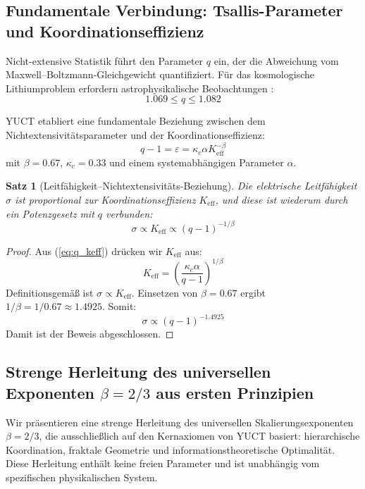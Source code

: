 \documentclass[12pt,a4paper]{article}
\newtheorem{theorem}{Satz}[section]
\theoremstyle{remark}
\newcommand{\Ke}{K_{\mathrm{eff}}}
\newcommand{\kappac}{\kappa_c}
\newcommand{\alp}{\alpha}
\begin{document}
	\subsection{Fundamentale Verbindung: Tsallis-Parameter und Koordinationseffizienz}
	
	Nicht-extensive Statistik \cite{tsallis1988} führt den Parameter \(q\) ein, der die Abweichung vom Maxwell–Boltzmann-Gleichgewicht quantifiziert. Für das kosmologische Lithiumproblem erfordern astrophysikalische Beobachtungen \cite{bertulani2015}:
	\begin{equation}
		1.069 \le q \le 1.082
		\label{eq:q_range}
	\end{equation}
	
	YUCT etabliert eine fundamentale Beziehung zwischen dem Nichtextensivitätsparameter und der Koordinationseffizienz:
	\begin{equation}
		q - 1 = \varepsilon = \kappac \alp \Ke^{-\beta}
		\label{eq:q_keff}
	\end{equation}
	mit \(\beta = 0.67\), \(\kappac = 0.33\) und einem systemabhängigen Parameter \(\alp\).
	
	\begin{theorem}[Leitfähigkeit–Nichtextensivitäts-Beziehung]
		Die elektrische Leitfähigkeit \(\sigma\) ist proportional zur Koordinationseffizienz \(\Ke\), und diese ist wiederum durch ein Potenzgesetz mit \(q\) verbunden:
		\begin{equation}
			\sigma \propto \Ke \propto (q-1)^{-1/\beta}
			\label{eq:sigma_q}
		\end{equation}
		\label{th:conductivity}
	\end{theorem}
	
	\begin{proof}
		Aus (\ref{eq:q_keff}) drücken wir \(\Ke\) aus:
		\[
		\Ke = \left( \frac{\kappac \alp}{q-1} \right)^{1/\beta}
		\]
		Definitionsgemäß ist \(\sigma \propto \Ke\). Einsetzen von \(\beta = 0.67\) ergibt \(1/\beta = 1/0.67 \approx 1.4925\). Somit:
		\[
		\sigma \propto (q-1)^{-1.4925}
		\]
		Damit ist der Beweis abgeschlossen.
	\end{proof}
	
	\subsection{Strenge Herleitung des universellen Exponenten \(\beta = 2/3\) aus ersten Prinzipien}
	\label{subsec:beta_derivation}
	
	Wir präsentieren eine strenge Herleitung des universellen Skalierungsexponenten \(\beta = 2/3\), die ausschließlich auf den Kernaxiomen von YUCT basiert: hierarchische Koordination, fraktale Geometrie und informationstheoretische Optimalität. Diese Herleitung enthält keine freien Parameter und ist unabhängig vom spezifischen physikalischen System.
	
\end{document}
